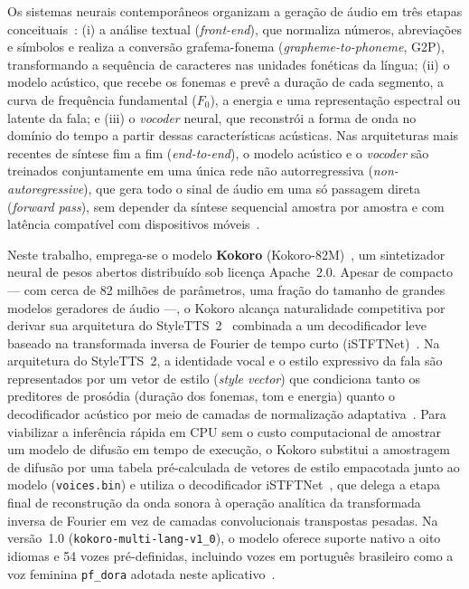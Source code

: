 Os sistemas neurais contemporâneos organizam a geração de áudio em três etapas conceituais~\cite{tan2021survey}: (i) a análise textual (\textit{front-end}), que normaliza números, abreviações e símbolos e realiza a conversão grafema-fonema (\textit{grapheme-to-phoneme}, G2P), transformando a sequência de caracteres nas unidades fonéticas da língua; (ii) o modelo acústico, que recebe os fonemas e prevê a duração de cada segmento, a curva de frequência fundamental ($F_0$), a energia e uma representação espectral ou latente da fala; e (iii) o \textit{vocoder} neural, que reconstrói a forma de onda no domínio do tempo a partir dessas características acústicas. Nas arquiteturas mais recentes de síntese fim a fim (\textit{end-to-end}), o modelo acústico e o \textit{vocoder} são treinados conjuntamente em uma única rede não autorregressiva (\textit{non-autoregressive}), que gera todo o sinal de áudio em uma só passagem direta (\textit{forward pass}), sem depender da síntese sequencial amostra por amostra e com latência compatível com dispositivos móveis~\cite{tan2021survey,li2023styletts2}.

Neste trabalho, emprega-se o modelo \textbf{Kokoro} (Kokoro-82M)~\cite{kokoro82m}, um sintetizador neural de pesos abertos distribuído sob licença Apache~2.0. Apesar de compacto --- com cerca de 82 milhões de parâmetros, uma fração do tamanho de grandes modelos geradores de áudio ---, o Kokoro alcança naturalidade competitiva por derivar sua arquitetura do StyleTTS~2~\cite{li2023styletts2} combinada a um decodificador leve baseado na transformada inversa de Fourier de tempo curto (iSTFTNet)~\cite{kaneko2022istftnet}. Na arquitetura do StyleTTS~2, a identidade vocal e o estilo expressivo da fala são representados por um vetor de estilo (\textit{style vector}) que condiciona tanto os preditores de prosódia (duração dos fonemas, tom e energia) quanto o decodificador acústico por meio de camadas de normalização adaptativa~\cite{li2023styletts2}. Para viabilizar a inferência rápida em CPU sem o custo computacional de amostrar um modelo de difusão em tempo de execução, o Kokoro substitui a amostragem de difusão por uma tabela pré-calculada de vetores de estilo empacotada junto ao modelo (\texttt{voices.bin}) e utiliza o decodificador iSTFTNet~\cite{kaneko2022istftnet}, que delega a etapa final de reconstrução da onda sonora à operação analítica da transformada inversa de Fourier em vez de camadas convolucionais transpostas pesadas. Na versão~1.0 (\texttt{kokoro-multi-lang-v1\_0}), o modelo oferece suporte nativo a oito idiomas e 54 vozes pré-definidas, incluindo vozes em português brasileiro como a voz feminina \texttt{pf\_dora} adotada neste aplicativo~\cite{kokoro82m}.

